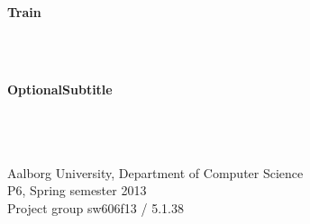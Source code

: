 \thispagestyle{empty}

\begin{center}
\vspace*{\fill}
	\hrulefill\newline
	\\
	\begin{LARGE}	
	\textbf{Train}
	\end{LARGE}
	\\
	\begin{large} 
	\textbf{\\OptionalSubtitle}%
	\end{large}\\
	\hrulefill\newline
	\\~\\
	Aalborg University, Department of Computer Science\\
	P6, Spring semester 2013\\
	Project group sw606f13 / 5.1.38\\

\vspace*{1.5cm}
\begin{figure}[H]
\end{figure}
\vspace*{\fill}
\end{center}